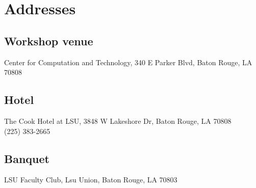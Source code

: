 \documentclass[12pt]{book}
\begin{document}
\section{Addresses}

\subsection*{Workshop venue}
Center for Computation and Technology, 340 E Parker Blvd, Baton Rouge, LA 70808
\subsection*{Hotel}
The Cook Hotel at LSU, 3848 W Lakeshore Dr, Baton Rouge, LA 70808 \\
(225) 383-2665
\subsection*{Banquet}
LSU Faculty Club, Lsu Union, Baton Rouge, LA 70803




\backmatter
\renewcommand{\indexname}{Author Index}
\printindex
\end{document}
